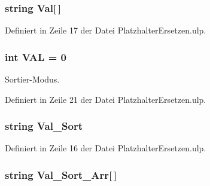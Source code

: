 \hypertarget{_platzhalter_ersetzen_8ulp_a088204f20433deace071409889b5aba1}{}
\subsubsection[{Val}]{\setlength{\rightskip}{0pt plus 5cm}string Val\mbox{[}$\,$\mbox{]}}\label{_platzhalter_ersetzen_8ulp_a088204f20433deace071409889b5aba1}


Definiert in Zeile 17 der Datei Platzhalter\+Ersetzen.\+ulp.

\hypertarget{_platzhalter_ersetzen_8ulp_a9d0755616c25d32c802e0786308b8fba}{}
\subsubsection[{V\+A\+L}]{\setlength{\rightskip}{0pt plus 5cm}int V\+A\+L = 0}\label{_platzhalter_ersetzen_8ulp_a9d0755616c25d32c802e0786308b8fba}


Sortier-\/\+Modus. 



Definiert in Zeile 21 der Datei Platzhalter\+Ersetzen.\+ulp.

\hypertarget{_platzhalter_ersetzen_8ulp_a4a476a4ca9399cdb40f332c3f4f194f5}{}
\subsubsection[{Val\+\_\+\+Sort}]{\setlength{\rightskip}{0pt plus 5cm}string Val\+\_\+\+Sort}\label{_platzhalter_ersetzen_8ulp_a4a476a4ca9399cdb40f332c3f4f194f5}


Definiert in Zeile 16 der Datei Platzhalter\+Ersetzen.\+ulp.

\hypertarget{_platzhalter_ersetzen_8ulp_af793855284d36c1b154929e9737ad5eb}{}
\subsubsection[{Val\+\_\+\+Sort\+\_\+\+Arr}]{\setlength{\rightskip}{0pt plus 5cm}string Val\+\_\+\+Sort\+\_\+\+Arr\mbox{[}$\,$\mbox{]}}\label{_platzhalter_ersetzen_8ulp_af793855284d36c1b154929e9737ad5eb}


